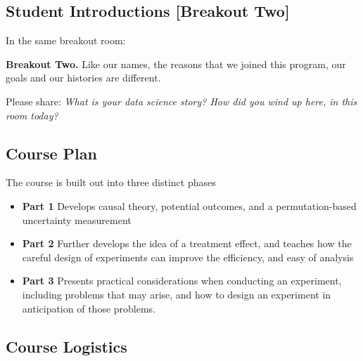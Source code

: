 \documentclass[
]{article}
\providecommand{\tightlist}{%
  \setlength{\itemsep}{0pt}\setlength{\parskip}{0pt}}
\theoremstyle{definition}
\theoremstyle{definition}
\theoremstyle{definition}
\theoremstyle{definition}
\theoremstyle{remark}
\begin{document}
\subsection{Student Introductions {[}Breakout Two{]}}\label{student-introductions-breakout-two-1}

In the same breakout room:

\begin{breakout}
\textbf{Breakout Two.}
Like our names, the reasons that we joined this program, our goals and our histories are different.

Please share: \emph{What is your data science story? How did you wind up here, in this room today?}

\end{breakout}

\subsection{Course Plan}\label{course-plan-1}

The course is built out into three distinct phases

\begin{itemize}
\tightlist
\item
  \textbf{Part 1} Develops causal theory, potential outcomes, and a permutation-based uncertainty measurement
\item
  \textbf{Part 2} Further develops the idea of a treatment effect, and teaches how the careful design of experiments can improve the efficiency, and easy of analysis
\item
  \textbf{Part 3} Presents practical considerations when conducting an experiment, including problems that may arise, and how to design an experiment in anticipation of those problems.
\end{itemize}

\subsection{Course Logistics}\label{course-logistics-1}
\end{document}
